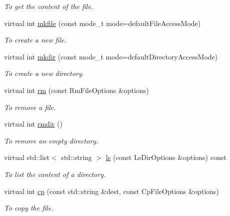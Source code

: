 \begin{DoxyCompactItemize}
\begin{DoxyCompactList}\small\item\em To get the content of the file. \item\end{DoxyCompactList}\item 
virtual int \hyperlink{classRemoteFileProxy_a3306f92d078a55a0435d4b921b24ed38}{mkfile} (const mode\_\-t mode=defaultFileAccessMode)
\begin{DoxyCompactList}\small\item\em To create a new file. \item\end{DoxyCompactList}\item 
virtual int \hyperlink{classRemoteFileProxy_a9bb2fa125b4b0cc7819bbf77d2bb46ee}{mkdir} (const mode\_\-t mode=defaultDirectoryAccessMode)
\begin{DoxyCompactList}\small\item\em To create a new directory. \item\end{DoxyCompactList}\item 
virtual int \hyperlink{classRemoteFileProxy_a8e849fd6f8d78e14114e14a2eaacb75a}{rm} (const RmFileOptions \&options)
\begin{DoxyCompactList}\small\item\em To remove a file. \item\end{DoxyCompactList}\item 
virtual int \hyperlink{classRemoteFileProxy_abfde4c2173294f6dfd5958a8b6c88cdb}{rmdir} ()
\begin{DoxyCompactList}\small\item\em To remove an empty directory. \item\end{DoxyCompactList}\item 
virtual std::list$<$ std::string $>$ \hyperlink{classRemoteFileProxy_af85a6a1f46e0335640b47df4d2c7093a}{ls} (const LsDirOptions \&options) const 
\begin{DoxyCompactList}\small\item\em To list the content of a directory. \item\end{DoxyCompactList}\item 
virtual int \hyperlink{classRemoteFileProxy_a17ea6be4c77a0779317c69b0eb21b793}{cp} (const std::string \&dest, const CpFileOptions \&options)
\begin{DoxyCompactList}\small\item\em To copy the file. \item\end{DoxyCompactList}\item 

\end{DoxyCompactItemize}
